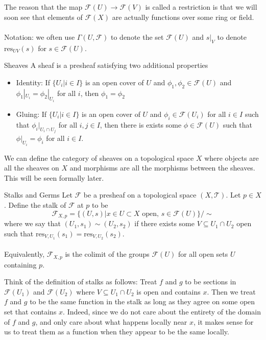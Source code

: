 \documentclass[a4paper]{article}
\begin{document}
The reason that the map $\mathcal{F}(U)\to\mathcal{F}(V)$ is called a restriction is that we will soon see that elements of $\mathcal{F}(X)$ are actually functions over some ring or field. \\~\\
Notation: we often use $\Gamma(U,\mathcal{F})$ to denote the set $\mathcal{F}(U)$ and $s|_V$ to denote $\text{res}_{UV}(s)$ for $s\in\mathcal{F}(U)$. 

\begin{defn}{Sheaves}{} A sheaf is a presheaf satisfying two additional properties
\begin{itemize}
\item Identity: If $\{U_i|i\in I\}$ is an open cover of $U$ and $\phi_1,\phi_2\in\mathcal{F}(U)$ and $\phi_1|_{U_i}=\phi_2|_{U_i}$ for all $i$, then $\phi_1=\phi_2$
\item Gluing: If $\{U_i|i\in I\}$ is an open cover of $U$ and $\phi_i\in\mathcal{F}(U_i)$ for all $i\in I$ such that $\phi_i|_{U_i\cap U_j}$ for all $i,j\in I$, then there is exists some $\phi\in\mathcal{F}(U)$ such that $\phi|_{U_i}=\phi_i$ for all $i\in I$. 
\end{itemize}
\end{defn}

We can define the category of sheaves on a topological space $X$ where objects are all the sheaves on $X$ and morphisms are all the morphisms between the sheaves. This will be seen formally later. 

\begin{defn}{Stalks and Germs}{} Let $\mathcal{F}$ be a presheaf on a topological space $(X,\mathcal{T})$. Let $p\in X$. Define the stalk of $\mathcal{F}$ at $p$ to be $$\mathcal{F}_{X,p}=\{(U,s)|x\in U\subset X\text{ open, }s\in\mathcal{F}(U)\}/\sim$$ where we say that $(U_1,s_1)\sim(U_2,s_2)$ if there exists some $V\subseteq U_1\cap U_2$ open such that $\text{res}_{V,U_1}(s_1)=\text{res}_{V,U_2}(s_2)$. \\~\\
Equivalently, $\mathcal{F}_{X,p}$ is the colimit of the groups $\mathcal{F}(U)$ for all open sets $U$ containing $p$. 
\end{defn}

Think of the definition of stalks as follows: Treat $f$ and $g$ to be sections in $\mathcal{F}(U_1)$ and $\mathcal{F}(U_2)$ where $V\subseteq U_1\cap U_2$ is open and contains $x$. Then we treat $f$ and $g$ to be the same function in the stalk as long as they agree on some open set that contains $x$. Indeed, since we do not care about the entirety of the domain of $f$ and $g$, and only care about what happens locally near $x$, it makes sense for us to treat them as a function when they appear to be the same locally. 
\end{document}
